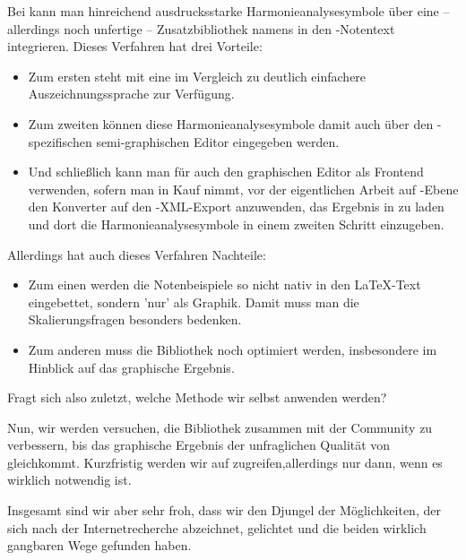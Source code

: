 Bei  kann man hinreichend ausdrucksstarke
Harmonieanalysesymbole über eine -- allerdings noch unfertige --
Zusatzbibliothek namens  in den -Notentext integrieren.
Dieses Verfahren hat drei Vorteile:

\begin{itemize}
  \item Zum ersten steht mit  eine im Vergleich zu 
  deutlich einfachere Auszeichnungssprache zur Verfügung.
  \item Zum zweiten können diese Harmonieanalysesymbole
  damit auch über den -spezifischen semi-graphischen Editor
   eingegeben werden.
  \item Und schließlich kann man für  auch den graphischen Editor
   als Frontend verwenden, sofern man in Kauf nimmt, vor der
  eigentlichen Arbeit auf -Ebene den Konverter
   auf den -XML-Export anzuwenden, das Ergebnis
  in  zu laden und dort die Harmonieanalysesymbole in einem
  zweiten Schritt einzugeben.
\end{itemize}

Allerdings hat auch dieses Verfahren Nachteile:

\begin{itemize}
  \item Zum einen werden die Notenbeispiele so nicht nativ in den \LaTeX-Text
  eingebettet, sondern 'nur' als Graphik. Damit muss man die Skalierungsfragen
  besonders bedenken.
  \item Zum anderen muss die Bibliothek  noch optimiert werden,
  insbesondere im Hinblick auf das graphische Ergebnis.
\end{itemize}

Fragt sich also zuletzt, welche Methode wir selbst anwenden werden? 

Nun, wir werden versuchen, die Bibliothek  zusammen mit der
 Community zu verbessern, bis das graphische Ergebnis der
unfraglichen Qualität von  gleichkommt. Kurzfristig
werden wir auf  zugreifen,allerdings nur dann, wenn
es wirklich notwendig ist.

Insgesamt sind wir aber sehr froh, dass wir den Djungel der Möglichkeiten, der
sich nach der Internetrecherche abzeichnet, gelichtet und die beiden wirklich
gangbaren Wege gefunden haben.



%
